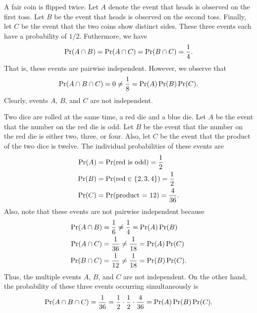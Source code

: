 \begin{example}
A fair coin is flipped twice.
Let $A$ denote the event that heads is observed on the first toss.
Let $B$ be the event that heads is observed on the second toss.
Finally, let $C$ be the event that the two coins show distinct sides.
These three events each have a probability of $1/2$.
Futhermore, we have
\begin{equation*}
\Pr (A \cap B) = \Pr (A \cap C) = \Pr (B \cap C) = \frac{1}{4} .
\end{equation*}
That is, these events are pairwise independent.
However, we observe that
\begin{equation*}
\Pr (A \cap B \cap C) = 0 \neq \frac{1}{8} = \Pr (A) \Pr (B) \Pr (C) .
\end{equation*}
Clearly, events $A$, $B$, and $C$ are not independent.
\end{example}

\begin{example}
Two dice are rolled at the same time, a red die and a blue die.
Let $A$ be the event that the number on the red die is odd.
Let $B$ be the event that the number on the red die is either two, three, or four.
Also, let $C$ be the event that the product of the two dice is twelve.
The individual probabilities of these events are
\begin{align*}
\Pr (A) &= \Pr (\text{red is odd}) = \frac{1}{2} \\
\Pr (B) &= \Pr (\text{red} \in \{2, 3, 4\}) = \frac{1}{2} \\
\Pr (C) &= \Pr (\text{product = 12}) = \frac{4}{36} .
\end{align*}
Also, note that these events are not pairwise independent because
\begin{align*}
\Pr (A \cap B) &= \frac{1}{6} \neq \frac{1}{4} = \Pr(A) \Pr(B) \\
\Pr (A \cap C) &= \frac{1}{36} \neq \frac{1}{18} = \Pr(A) \Pr(C) \\
\Pr (B \cap C) &= \frac{1}{12} \neq \frac{1}{18} = \Pr(B) \Pr(C) .
\end{align*}
Thus, the multiple events $A$, $B$, and $C$ are not independent.
On the other hand, the probability of these three events occurring simultaneously is
\begin{equation*}
\Pr (A \cap B \cap C) = \frac{1}{36}
= \frac{1}{2} \cdot \frac{1}{2} \cdot \frac{4}{36}
= \Pr (A) \Pr (B) \Pr (C) .
\end{equation*}
\end{example}

